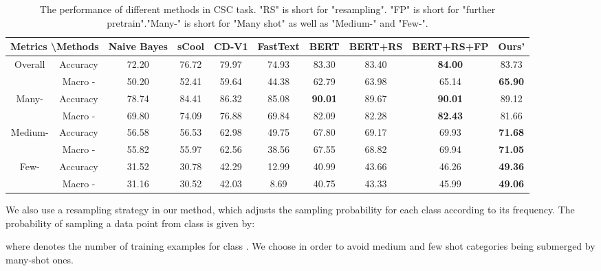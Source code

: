 \documentclass{article}
\begin{document}
\begin{table*}[htbp]
\centering
\begin{tabular}{cc||ccccc|cc|c}

\toprule
  \multicolumn{2}{c||}{Metrics \textbackslash Methods}  & Naive Bayes & sCool & CD-V1  &FastText  &  BERT      & BERT+RS            & BERT+RS+FP      & Ours'          \\ \midrule
\multirow{2}{*}{Overall}            & Accuracy          & 72.20       & 76.72 & 79.97 &74.93   & 83.30         &83.40            &\textbf{84.00}    & 83.73      \\ 
& Macro -      & 50.20       & 52.41 & 59.64  &44.38  & 62.79         &63.98            & 65.14        & \textbf{65.90}      \\ \midrule 
\multirow{2}{*}{Many-}          & Accuracy          & 78.74       & 84.41 & 86.32 &85.08   &\textbf{90.01} &89.67            &\textbf{90.01}& 89.12               \\ 
& Macro -      & 69.80       & 74.09 & 76.88 &69.84    &82.09          &82.28            &\textbf{82.43}& 81.66               \\ \midrule
\multirow{2}{*}{Medium-}        & Accuracy          & 56.58       & 56.53 & 62.98  &49.75  & 67.80         &69.17            & 69.93        & \textbf{71.68}      \\ 
& Macro -      & 55.82       & 55.97 & 62.56 &38.56   & 67.55         &68.82            & 69.94        & \textbf{71.05}      \\ \midrule
\multirow{2}{*}{Few-}           & Accuracy          & 31.52       & 30.78 & 42.29  &12.99  & 40.99         &43.66            & 46.26        & \textbf{49.36}      \\ 
& Macro -      & 31.16       & 30.52 & 42.03  &8.69  & 40.75         &43.33            & 45.99        & \textbf{49.06}      \\ 
\bottomrule

\end{tabular}
\caption{The performance of different methods in CSC task. "RS" is short for "resampling". "FP" is short for "further pretrain"."Many-" is short for "Many shot" as well as "Medium-" and "Few-".}
\label{tab:result-s}
\end{table*}

We also use a resampling strategy in our method, which adjusts the sampling probability for each class according to its frequency. The probability  of sampling a data point from class  is given by:

where  denotes the number of training examples for class . We choose  in order to avoid medium and few shot categories being submerged by many-shot ones. 
\end{document}
